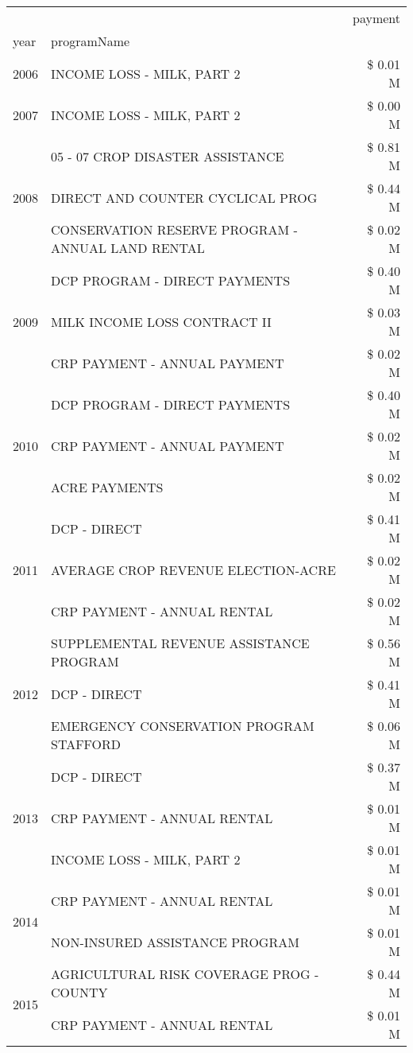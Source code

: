 \begin{tabular}{llr}
\toprule
 &  & payment \\
year & programName &  \\
\midrule
2006 & INCOME LOSS - MILK, PART 2 & \$ 0.01 M \\
\cline{1-3}
2007 & INCOME LOSS - MILK, PART 2 & \$ 0.00 M \\
\cline{1-3}
\multirow[t]{3}{*}{2008} & 05 - 07 CROP DISASTER ASSISTANCE & \$ 0.81 M \\
 & DIRECT AND COUNTER CYCLICAL PROG & \$ 0.44 M \\
 & CONSERVATION RESERVE PROGRAM - ANNUAL LAND RENTAL & \$ 0.02 M \\
\cline{1-3}
\multirow[t]{3}{*}{2009} & DCP PROGRAM - DIRECT PAYMENTS & \$ 0.40 M \\
 & MILK INCOME LOSS CONTRACT II & \$ 0.03 M \\
 & CRP PAYMENT - ANNUAL PAYMENT & \$ 0.02 M \\
\cline{1-3}
\multirow[t]{3}{*}{2010} & DCP PROGRAM - DIRECT PAYMENTS & \$ 0.40 M \\
 & CRP PAYMENT - ANNUAL PAYMENT & \$ 0.02 M \\
 & ACRE PAYMENTS & \$ 0.02 M \\
\cline{1-3}
\multirow[t]{3}{*}{2011} & DCP - DIRECT & \$ 0.41 M \\
 & AVERAGE CROP REVENUE ELECTION-ACRE & \$ 0.02 M \\
 & CRP PAYMENT - ANNUAL RENTAL & \$ 0.02 M \\
\cline{1-3}
\multirow[t]{3}{*}{2012} & SUPPLEMENTAL REVENUE ASSISTANCE PROGRAM & \$ 0.56 M \\
 & DCP - DIRECT & \$ 0.41 M \\
 & EMERGENCY CONSERVATION PROGRAM STAFFORD & \$ 0.06 M \\
\cline{1-3}
\multirow[t]{3}{*}{2013} & DCP - DIRECT & \$ 0.37 M \\
 & CRP PAYMENT - ANNUAL RENTAL & \$ 0.01 M \\
 & INCOME LOSS - MILK, PART 2 & \$ 0.01 M \\
\cline{1-3}
\multirow[t]{2}{*}{2014} & CRP PAYMENT - ANNUAL RENTAL & \$ 0.01 M \\
 & NON-INSURED ASSISTANCE PROGRAM & \$ 0.01 M \\
\cline{1-3}
\multirow[t]{2}{*}{2015} & AGRICULTURAL RISK COVERAGE PROG - COUNTY & \$ 0.44 M \\
 & CRP PAYMENT - ANNUAL RENTAL & \$ 0.01 M \\
\cline{1-3}

\end{tabular}
